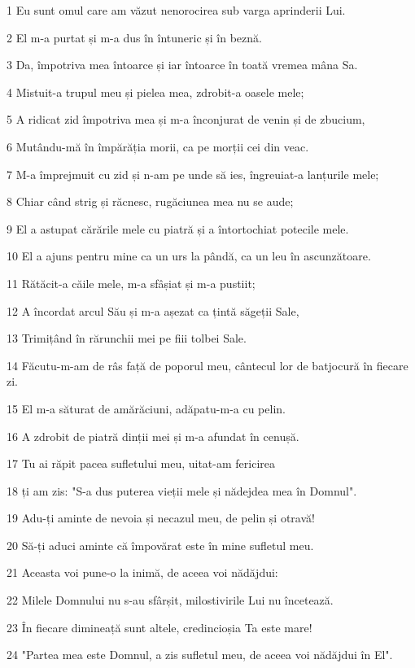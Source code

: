 \par 1 Eu sunt omul care am văzut nenorocirea sub varga aprinderii Lui.
\par 2 El m-a purtat și m-a dus în întuneric și în beznă.
\par 3 Da, împotriva mea întoarce și iar întoarce în toată vremea mâna Sa.
\par 4 Mistuit-a trupul meu și pielea mea, zdrobit-a oasele mele;
\par 5 A ridicat zid împotriva mea și m-a înconjurat de venin și de zbucium,
\par 6 Mutându-mă în împărăția morii, ca pe morții cei din veac.
\par 7 M-a împrejmuit cu zid și n-am pe unde să ies, îngreuiat-a lanțurile mele;
\par 8 Chiar când strig și răcnesc, rugăciunea mea nu se aude;
\par 9 El a astupat cărările mele cu piatră și a întortochiat potecile mele.
\par 10 El a ajuns pentru mine ca un urs la pândă, ca un leu în ascunzătoare.
\par 11 Rătăcit-a căile mele, m-a sfâșiat și m-a pustiit;
\par 12 A încordat arcul Său și m-a așezat ca țintă săgeții Sale,
\par 13 Trimițând în rărunchii mei pe fiii tolbei Sale.
\par 14 Făcutu-m-am de râs față de poporul meu, cântecul lor de batjocură în fiecare zi.
\par 15 El m-a săturat de amărăciuni, adăpatu-m-a cu pelin.
\par 16 A zdrobit de piatră dinții mei și m-a afundat în cenușă.
\par 17 Tu ai răpit pacea sufletului meu, uitat-am fericirea
\par 18 ți am zis: "S-a dus puterea vieții mele și nădejdea mea în Domnul".
\par 19 Adu-ți aminte de nevoia și necazul meu, de pelin și otravă!
\par 20 Să-ți aduci aminte că împovărat este în mine sufletul meu.
\par 21 Aceasta voi pune-o la inimă, de aceea voi nădăjdui:
\par 22 Milele Domnului nu s-au sfârșit, milostivirile Lui nu încetează.
\par 23 În fiecare dimineață sunt altele, credincioșia Ta este mare!
\par 24 "Partea mea este Domnul, a zis sufletul meu, de aceea voi nădăjdui în El".
